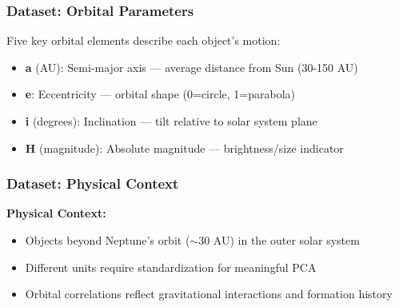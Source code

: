 \documentclass[aspectratio=169]{beamer}
\begin{document}
\begin{frame}
    \frametitle{Dataset: Orbital Parameters}
    Five key orbital elements describe each object's motion:
    \begin{itemize}
        \item \textbf{a} (AU): Semi-major axis — average distance from Sun (30-150 AU) \pause
        \item \textbf{e}: Eccentricity — orbital shape (0=circle, 1=parabola) \pause
        \item \textbf{i} (degrees): Inclination — tilt relative to solar system plane \pause
        \item \textbf{H} (magnitude): Absolute magnitude — brightness/size indicator \pause
    \end{itemize}
\end{frame}

\begin{frame}
    \frametitle{Dataset: Physical Context}
    \textbf{Physical Context:}
    \begin{itemize}
        \item Objects beyond Neptune's orbit ($\sim$30 AU) in the outer solar system \pause
        \item Different units require standardization for meaningful PCA \pause
        \item Orbital correlations reflect gravitational interactions and formation history \pause
    \end{itemize}
\end{frame}
\end{document}
